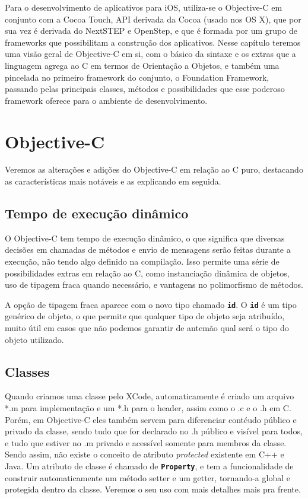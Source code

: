 \documentclass[a4paper,12pt,brazil,oneside]{book}
\begin{document}
Para o desenvolvimento de aplicativos para iOS, utiliza-se o Objective-C em conjunto com a Cocoa Touch, API derivada da Cocoa (usado nos OS X), que por sua vez é derivada do NextSTEP e OpenStep, e que é formada por um grupo de frameworks que possibilitam a construção dos aplicativos. Nesse capítulo teremos uma visão geral de Objective-C em si, com o básico da sintaxe e os extras que a linguagem agrega ao C em termos de Orientação a Objetos, e também uma pincelada no primeiro framework do conjunto, o Foundation Framework, passando pelas principais classes, métodos e possibilidades que esse poderoso framework oferece para o ambiente de desenvolvimento.

\section{Objective-C}

Veremos as alterações e adições do Objective-C em relação ao C puro, destacando as características mais notáveis e as explicando em seguida.

\subsection{Tempo de execução dinâmico}


O Objective-C tem tempo de execução dinâmico, o que significa que diversas decisões em chamadas de métodos e envio de mensagens serão feitas durante a execução, não tendo algo definido na compilação. Isso permite uma série de possibilidades extras em relação ao C, como instanciação dinâmica de objetos, uso de tipagem fraca quando necessário, e vantagens no polimorfismo de métodos.

A opção de tipagem fraca aparece com o novo tipo chamado \texttt{\textbf{id}}. O \texttt{\textbf{id}} é um tipo genérico de objeto, o que permite que qualquer tipo de objeto seja atribuído, muito útil em casos que não podemos garantir de antemão qual será o tipo do objeto utilizado.

\subsection{Classes}

Quando criamos uma classe pelo XCode, automaticamente é criado um arquivo *.m para implementação e um *.h para o header, assim como o .c e o .h em C. Porém, em Objective-C eles também servem para diferenciar contéudo público e privado da classe, sendo tudo que for declarado no .h público e visível para todos, e tudo que estiver no .m privado e acessível somente para membros da classe. Sendo assim, não existe o conceito de atributo \emph{protected} existente em C++ e Java. Um atributo de classe é chamado de \texttt{\textbf{Property}}, e tem a funcionalidade de construir automaticamente um método setter e um getter, tornando-a global e protegida dentro da classe. Veremos o seu uso com mais detalhes mais pra frente.
\end{document}
